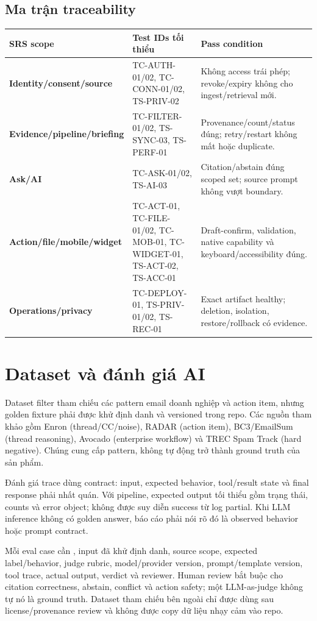\documentclass[11pt,a4paper]{article}
\begin{document}
\subsection{Ma trận traceability}
\begin{tabularx}{\textwidth}{>{\bfseries}p{3.2cm}p{4.6cm}X}
\toprule SRS scope & Test IDs tối thiểu & Pass condition \\ \midrule
Identity/consent/source & TC-AUTH-01/02, TC-CONN-01/02, TS-PRIV-02 & Không access trái phép; revoke/expiry không cho ingest/retrieval mới. \\
Evidence/pipeline/briefing & TC-FILTER-01/02, TS-SYNC-03, TS-PERF-01 & Provenance/count/status đúng; retry/restart không mất hoặc duplicate. \\
Ask/AI & TC-ASK-01/02, TS-AI-03 & Citation/abstain đúng scoped set; source prompt không vượt boundary. \\
Action/file/mobile/widget & TC-ACT-01, TC-FILE-01/02, TC-MOB-01, TC-WIDGET-01, TS-ACT-02, TS-ACC-01 & Draft-confirm, validation, native capability và keyboard/accessibility đúng. \\
Operations/privacy & TC-DEPLOY-01, TS-PRIV-01/02, TS-REC-01 & Exact artifact healthy; deletion, isolation, restore/rollback có evidence. \\
\bottomrule
\end{tabularx}

\section{Dataset và đánh giá AI}
Dataset filter tham chiếu các pattern email doanh nghiệp và action item, nhưng golden fixture phải được khử định danh và versioned trong repo. Các nguồn tham khảo gồm Enron (thread/CC/noise), RADAR (action item), BC3/EmailSum (thread reasoning), Avocado (enterprise workflow) và TREC Spam Track (hard negative). Chúng cung cấp pattern, không tự động trở thành ground truth của sản phẩm.

Đánh giá trace dùng contract: input, expected behavior, tool/result state và final response phải nhất quán. Với pipeline, expected output tối thiểu gồm trạng thái, counts và error object; không được suy diễn success từ log partial. Khi LLM inference không có golden answer, báo cáo phải nói rõ đó là observed behavior hoặc prompt contract.

Mỗi eval case cần , input đã khử định danh, source scope, expected label/behavior, judge rubric, model/provider version, prompt/template version, tool trace, actual output, verdict và reviewer. Human review bắt buộc cho citation correctness, abstain, conflict và action safety; một LLM-as-judge không tự nó là ground truth. Dataset tham chiếu bên ngoài chỉ được dùng sau license/provenance review và không được copy dữ liệu nhạy cảm vào repo.
\end{document}
